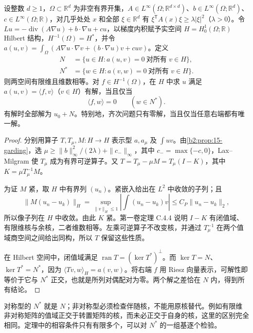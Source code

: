\begin{theorem}[椭圆边值问题的有限维障碍]
\label{b2:thm:15-fredholm-elliptic}
设整数 \(d\geq1\)，\(\Omega\subset\mathbb R^d\) 为非空有界开集，\(A\in L^\infty(\Omega;\mathbb R^{d\times d})\)、\(b\in L^\infty(\Omega;\mathbb R^d)\)、\(c\in L^\infty(\Omega;\mathbb R)\)，对几乎处处 \(x\) 和全部 \(\xi\in\mathbb R^d\) 有 \(\xi^{\mathsf T}A(x)\xi\geq\lambda|\xi|^2\)（\(\lambda>0\)）。令 \(Lu=-\operatorname{div}(A\nabla u)+b\cdot\nabla u+cu\)，以梯度内积赋予实空间 \(H=H_0^1(\Omega;\mathbb R)\) Hilbert 结构，\(H^{-1}(\Omega)=H^*\)，并令 \(a(u,v)=\int_\Omega(A\nabla u\cdot\nabla v+(b\cdot\nabla u)v+cuv)\)。定义
\[
 \begin{aligned}
 N&=\{u\in H:a(u,v)=0\ \text{对所有 }v\in H\},\\
 N^*&=\{w\in H:a(v,w)=0\ \text{对所有 }v\in H\}.
 \end{aligned}
\]
则两空间有限维且维数相等。对 \(f\in H^{-1}(\Omega)\)，在 \(H\) 中求 \(u\) 满足 \(a(u,v)=\langle f,v\rangle\)（\(v\in H\)）有解，当且仅当
\[\langle f,w\rangle=0\qquad(w\in N^*).\]
有解时全部解为 \(u_0+N\)。特别地，齐次问题只有零解，当且仅当任意右端都有唯一解。
\end{theorem}
\begin{proof}
分别用算子 \(T,T_\mu,M:H\to H\) 表示型 \(a,a_\mu\) 及 \(\int uv\)。由\cref{b2:prop:15-garding}，选
\(\mu\geq\|b\|_\infty^2/(2\lambda)+\|c_-\|_\infty\)，其中 \(c_-=\max\{-c,0\}\)，Lax--Milgram 使 \(T_\mu\) 成为有界可逆算子。又 \(T=T_\mu-\mu M=T_\mu(I-K)\)，其中 \(K=\mu T_\mu^{-1}M\)。

为证 \(M\) 紧，取 \(H\) 中有界列 \((u_n)\)。紧嵌入给出在 \(L^2\) 中收敛的子列；且
\[\lVert M(u_n-u_k)\rVert_H
 =\sup_{\lVert v\rVert_H\le1}\left|\int(u_n-u_k)v\right|
 \le C_P\lVert u_n-u_k\rVert_2,\]
所以像子列在 \(H\) 中收敛。由此 \(K\) 紧。第一卷定理 C.4.4 说明 \(I-K\) 有闭值域、有限维核与余核，二者维数相等。左乘可逆算子不改变核，并通过 \(T_\mu^{-1}\) 在两个值域商空间之间给出同构，所以 \(T\) 保留这些性质。

在 Hilbert 空间中，闭值域满足 \(\operatorname{ran}T=(\ker T^*)^\perp\)。而 \(\ker T=N\)、\(\ker T^*=N^*\)，因为 \(\langle Tv,w\rangle_H=a(v,w)\)。将右端 \(f\) 用 Riesz 向量表示，可解性即等价于它与 \(N^*\) 正交，也就是所列对偶配对为零。两个解之差恰在 \(N\) 内，得到所有结论。
\end{proof}

对称型的 \(N^*\) 就是 \(N\)；非对称型必须检查伴随核，不能用原核替代。例如有限维非对称矩阵的值域正交于转置矩阵的核，而未必正交于自身的核，这里的区别完全相同。定理中的相容条件只有有限多个，可以对 \(N^*\) 的一组基逐个检验。


